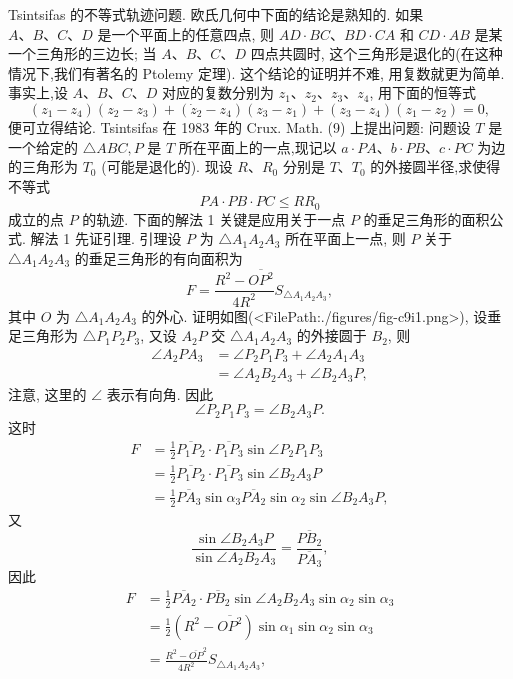 
Tsintsifas 的不等式轨迹问题.
欧氏几何中下面的结论是熟知的.
如果 $A 、 B 、 C 、 D$ 是一个平面上的任意四点, 则 $A D \cdot B C 、 B D \cdot C A$ 和 $C D \cdot A B$ 是某一个三角形的三边长; 当 $A 、 B 、 C 、 D$ 四点共圆时, 这个三角形是退化的(在这种情况下,我们有著名的 Ptolemy 定理).
这个结论的证明并不难, 用复数就更为简单.
事实上,设 $A 、 B 、 C 、 D$ 对应的复数分别为 $z_1 、 z_2 、 z_3 、 z_4$, 用下面的恒等式
$$
\left(z_1-z_4\right)\left(z_2-z_3\right)+\left(\dot{z}_2-z_4\right)\left(z_3-z_1\right)+\left(z_3-z_4\right)\left(z_1-z_2\right)=0,
$$
便可立得结论.
Tsintsifas 在 1983 年的 Crux. Math. (9) 上提出问题:
问题设 $T$ 是一个给定的 $\triangle A B C, P$ 是 $T$ 所在平面上的一点,现记以 $a \cdot P A 、 b \cdot P B 、 c \cdot P C$ 为边的三角形为 $T_0$ (可能是退化的). 现设 $R 、 R_0$ 分别是 $T 、 T_0$ 的外接圆半径,求使得不等式
$$
P A \cdot P B \cdot P C \leqslant R R_0
$$
成立的点 $P$ 的轨迹.
下面的解法 1 关键是应用关于一点 $P$ 的垂足三角形的面积公式.
解法 1 先证引理.
引理设 $P$ 为 $\triangle A_1 A_2 A_3$ 所在平面上一点, 则 $P$ 关于 $\triangle A_1 A_2 A_3$ 的垂足三角形的有向面积为
$$
F=\frac{R^2-\overline{O P^2}}{4 R^2} S_{\triangle A_1 A_2 A_3},
$$
其中 $O$ 为 $\triangle A_1 A_2 A_3$ 的外心.
证明如图(<FilePath:./figures/fig-c9i1.png>), 设垂足三角形为 $\triangle P_1 P_2 P_3$, 又设 $A_2 P$ 交 $\triangle A_1 A_2 A_3$ 的外接圆于 $B_2$, 则
$$
\begin{aligned}
\angle A_2 P A_3 & =\angle P_2 P_1 P_3+\angle A_2 A_1 A_3 \\
& =\angle A_2 B_2 A_3+\angle B_2 A_3 P,
\end{aligned}
$$
注意, 这里的 $\angle$ 表示有向角.
因此
$$
\angle P_2 P_1 P_3=\angle B_2 A_3 P .
$$
这时
$$
\begin{aligned}
F & =\frac{1}{2} \overline{P_1 P_2} \cdot \overline{P_1 P_3} \sin \angle P_2 P_1 P_3 \\
& =\frac{1}{2} \overline{P_1 P_2} \cdot \overline{P_1 P_3} \sin \angle B_2 A_3 P \\
& =\frac{1}{2} \overline{P A_3} \sin \alpha_3 \overline{P A_2} \sin \alpha_2 \sin \angle B_2 A_3 P,
\end{aligned}
$$
又
$$
\frac{\sin \angle B_2 A_3 P}{\sin \angle A_2 B_2 A_3}=\frac{\overline{P B_2}}{\overline{P A_3}},
$$
因此
$$
\begin{aligned}
F & =\frac{1}{2} \overline{P A_2} \cdot \overline{P B_2} \sin \angle A_2 B_2 A_3 \sin \alpha_2 \sin \alpha_3 \\
& =\frac{1}{2}\left(R^2-\overline{O P^2}\right) \sin \alpha_1 \sin \alpha_2 \sin \alpha_3 \\
& =\frac{R^2-\overline{O P}^2}{4 R^2} S_{\triangle A_1 A_2 A_3},
\end{aligned}
$$
